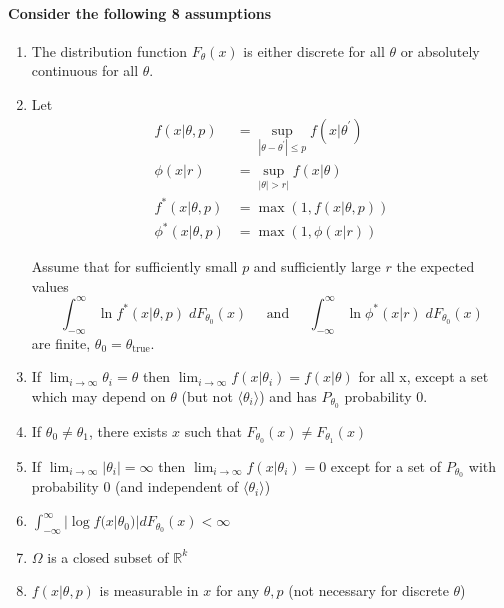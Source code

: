 \documentclass[letterpaper,11pt]{article}
\newcommand{\R}{\mathbb{R}}
\theoremstyle{definition}
\begin{document}
\paragraph{Consider the following 8 assumptions}
\begin{enumerate}
\item The distribution function $F_\theta(x)$ is either discrete for all $\theta$ or absolutely continuous for all $\theta$.
\item Let \vspace{-1em}
\begin{align*}
\displaystyle f(x|\theta, p) &= \sup_{|\theta-\theta^\prime|\leq p} f(x|\theta^\prime)\\
\displaystyle \phi(x|r) &= \sup_{|\theta| > r|} f(x|\theta)\\
\displaystyle f^\ast(x|\theta,p) &= \max(1, f(x|\theta,p))\\
\displaystyle \phi^\ast(x|\theta,p) &= \max(1, \phi(x|r))
\end{align*}

Assume that for sufficiently small $p$ and sufficiently large $r$ the expected values
$$\int_{-\infty}^\infty \ln f^\ast(x|\theta,p) \;dF_{\theta_0}(x) \;\;\;\;\;\text{and}\;\;\;\;\;
  \int_{-\infty}^\infty \ln \phi^\ast(x|r) \;dF_{\theta_0}(x)$$
are finite, $\theta_0 = \theta_{\text{true}}$.

\item If $\displaystyle \lim_{i\rightarrow\infty}\theta_i = \theta$ then $\displaystyle \lim_{i\rightarrow\infty} f(x|\theta_i) = f(x|\theta)$ for all x, except a set which may depend on $\theta$ (but not $\langle\theta_i\rangle$) and has $P_{\theta_0}$ probability 0.
\item If $\theta_0 \neq \theta_1$, there exists $x$ such that $F_{\theta_0}(x) \neq F_{\theta_1}(x)$
\item If $\displaystyle \lim_{i\rightarrow\infty}|\theta_i| = \infty$ then $\displaystyle \lim_{i\rightarrow\infty} f(x|\theta_i) = 0$ except for a set of $P_{\theta_0}$ with probability 0 (and independent of $\langle\theta_i\rangle$)
\item $\int_{-\infty}^\infty |\log f(x|\theta_0)| dF_{\theta_0}(x) < \infty$
\item $\Omega$ is a closed subset of $\R^k$
\item $f(x|\theta,p)$ is measurable in $x$ for any $\theta, p$ (not necessary for discrete $\theta$)
\end{enumerate}
\end{document}
